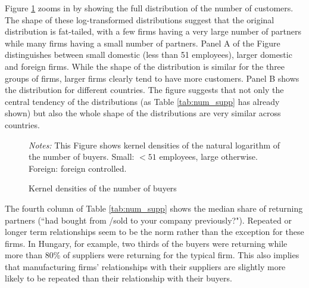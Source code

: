 \documentclass[final, dvipsnames, authoryear,12pt]{elsarticle}
\begin{document}
Figure \ref{fig:kernel} zooms in by showing the full distribution of the number of customers. The shape of these log-transformed distributions suggest that the original distribution is fat-tailed, with a few firms having a very large number of partners while many firms having a small number of partners. Panel A of the Figure distinguishes between small domestic (less than 51 employees), larger domestic and foreign firms. While the shape of the distribution is similar for the three groups of firms, larger firms clearly tend to have more customers. Panel B shows the distribution for different countries. The figure suggests that not only the central tendency of the distributions (as Table \ref{tab:num_supp} has already shown) but also the whole shape of the distributions are very similar across countries.


\begin{figure}[h]    
    \begin{center}
    \caption{Kernel densities of the number of buyers}
    \label{fig:kernel}       
    \end{center}
    {\footnotesize \textit{Notes:} This Figure shows kernel densities of the natural logarithm of the number of buyers. Small: $< 51$ employees, large otherwise. Foreign: foreign controlled.}
\end{figure}


The fourth column of Table \ref{tab:num_supp} shows the median share of returning partners (``had bought from /sold to your company previously?"). Repeated or longer term relationships seem to be the norm rather than the exception for these firms. In Hungary, for example,  two thirds of the buyers were returning while more than 80\% of suppliers were returning for the typical firm. This also implies that manufacturing firms' relationships with their suppliers are slightly more likely to be repeated than their relationship with their buyers.
\end{document}
